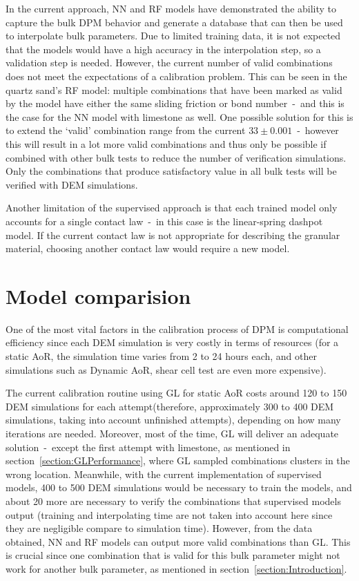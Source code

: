 In the current approach, NN and RF models have demonstrated the ability to capture the bulk DPM behavior and generate a database that can then be used to interpolate bulk parameters. Due to limited training data, it is not expected that the models would have a high accuracy in the interpolation step, so a validation step is needed. However, the current number of valid combinations does not meet the expectations of a calibration problem. This can be seen in the quartz sand's RF model: multiple combinations that have been marked as valid by the model have either the same sliding friction or bond number~-~and this is the case for the NN model with limestone as well. One possible solution for this is to extend the `valid' combination range from the current $33\pm0.001$~-~however this will result in a lot more valid combinations and thus only be possible if combined with other bulk tests to reduce the number of verification simulations. Only the combinations that produce satisfactory value in all bulk tests will be verified with DEM simulations. 

Another limitation of the supervised approach is that each trained model only accounts for a single contact law~-~in this case is the linear-spring dashpot model. If the current contact law is not appropriate for describing the granular material, choosing another contact law would require a new model. 


\section{Model comparision}\label{section:discussion}

One of the most vital factors in the calibration process of DPM is computational efficiency since each DEM simulation is very costly in terms of resources (for a static AoR, the simulation time varies from 2 to 24 hours each, and other simulations such as Dynamic AoR, shear cell test are even more expensive). 

The current calibration routine using GL for static AoR costs around 120 to 150 DEM simulations for each attempt(therefore, approximately 300 to 400 DEM simulations, taking into account unfinished attempts), depending on how many iterations are needed. Moreover, most of the time, GL will deliver an adequate solution~-~except the first attempt with limestone, as mentioned in section~\ref{section:GLPerformance}, where GL sampled combinations clusters in the wrong location. Meanwhile, with the current implementation of supervised models, 400 to 500 DEM simulations would be necessary to train the models, and about 20 more are necessary to verify the combinations that supervised models output (training and interpolating time are not taken into account here since they are negligible compare to simulation time). However, from the data obtained, NN and RF models can output more valid combinations than GL. This is crucial since one combination that is valid for this bulk parameter might not work for another bulk parameter, as mentioned in section~\ref{section:Introduction}. 

